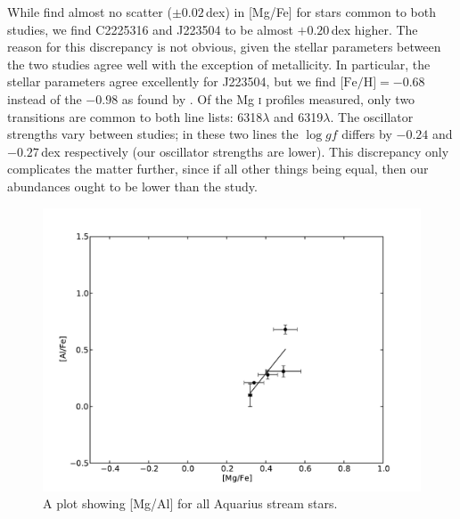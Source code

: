\documentclass{emulateapj}
\begin{document}
While \citet{wylie-de-boer;et-al_2012} find almost no scatter ($\pm0.02$\,dex) in [Mg/Fe] for stars common to both studies, we find C2225316 and J223504 to be almost $+0.20$\,dex higher. The reason for this discrepancy is not obvious, given the stellar parameters between the two studies agree well with the exception of metallicity. In particular, the stellar parameters agree excellently for J223504, but we find $\mbox{[Fe/H]} = -0.68$ instead of the $-0.98$ as found by \citet{wylie-de-boer;et-al_2012}. Of the Mg \textsc{i} profiles measured, only two transitions are common to both line lists: 6318$\lambda$ and 6319$\lambda$. The oscillator strengths vary between studies; in these two lines the $\log{gf}$ differs by $-0.24$ and $-0.27$\,dex respectively (our oscillator strengths are lower). This discrepancy only complicates the matter further, since if all other things being equal, then our abundances ought to be lower than the \citet{wylie-de-boer;et-al_2012} study. 



\begin{figure}[h]
	\includegraphics[width=\columnwidth]{./figures/aquarius-mg-al.pdf}
	\caption{A plot showing [Mg/Al] for all Aquarius stream stars.}
	\label{fig:mg-al}
\end{figure}
\end{document}

